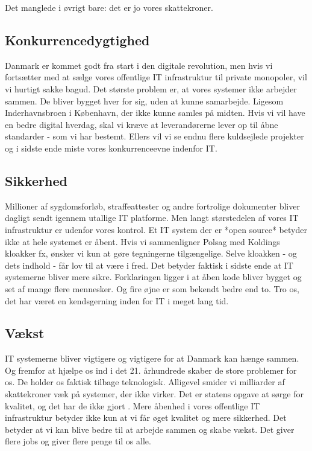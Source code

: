 \documentclass[fleqn]{article}
\begin{document}
Det manglede i øvrigt bare: det er jo vores skattekroner.

\subsection{Konkurrencedygtighed}
Danmark er kommet godt fra start i den digitale revolution, men hvis vi fortsætter
med at sælge vores offentlige IT infrastruktur til private monopoler, vil vi hurtigt sakke bagud.
Det største problem er, at vores systemer ikke arbejder sammen. De bliver bygget hver
for sig, uden at kunne samarbejde. Ligesom Inderhavnsbroen i København, der ikke kunne
samles på midten. %
Hvis vi vil have en bedre digital hverdag, skal vi kræve at leverandørerne lever op til 
åbne standarder - som vi har bestemt.
Ellers vil vi se endnu flere kuldsejlede projekter og i sidste ende miste vores
konkurrenceevne indenfor IT.

\subsection{Sikkerhed}
Millioner af sygdomsforløb, straffeattester og andre fortrolige
dokumenter bliver dagligt sendt igennem utallige IT platforme. Men langt størstedelen
af vores IT infrastruktur er udenfor vores kontrol.
Et IT system der er *open source* betyder ikke at hele systemet er åbent. 
Hvis vi sammenligner Polsag med Koldings kloakker fx, ønsker vi kun at gøre tegningerne
tilgængelige. Selve kloakken - og dets indhold - får lov til at være i fred.
Det betyder faktisk i sidste ende at IT systemerne bliver mere sikre. Forklaringen ligger
i at åben kode bliver bygget og set af mange flere mennesker. Og fire øjne er som bekendt
bedre end to. Tro os, det har været en kendsgerning inden for IT i meget lang tid.

\subsection{Vækst}
IT systemerne bliver vigtigere og vigtigere for at Danmark kan hænge sammen. Og fremfor
at hjælpe os ind i det 21. århundrede skaber de store problemer for os. De holder os faktisk
tilbage teknologisk. Alligevel smider vi milliarder af skattekroner væk på systemer, der
ikke virker.
Det er statens opgave at sørge for kvalitet, og det har de ikke gjort \cite{Lauesen}.
Mere åbenhed i vores offentlige IT infrastruktur betyder ikke kun at vi får øget
kvalitet og mere sikkerhed. Det betyder at vi kan blive bedre til at arbejde sammen og
skabe vækst. Det giver flere jobs og giver flere penge til os alle.
\end{document}
